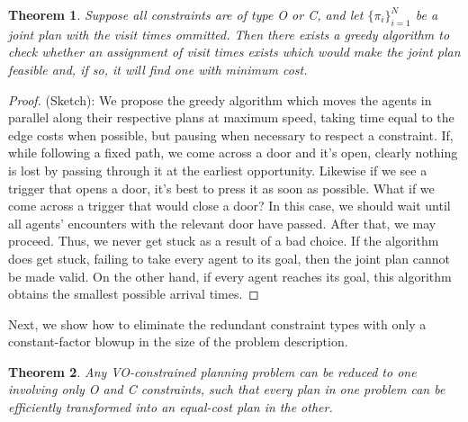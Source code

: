 \documentclass[letterpaper]{article}
\newtheorem{thm}{Theorem}
\begin{document}
\begin{thm}
\label{thm:greedy}
Suppose all constraints are of type O or C, and let $\{\pi_i\}_{i=1}^N$ be a joint plan with the visit times ommitted. Then there exists a greedy algorithm to check whether an assignment of visit times exists which would make the joint plan feasible and, if so, it will find one with minimum cost.
\end{thm} 

\begin{proof}
(Sketch): We propose the greedy algorithm which moves the agents in parallel along their respective plans at maximum speed, taking time equal to the edge costs when possible, but pausing when necessary to respect a constraint. If, while following a fixed path, we come across a door and it's open, clearly nothing is lost by passing through it at the earliest opportunity. Likewise if we see a trigger that opens a door, it's best to press it as soon as possible. What if we come across a trigger that would close a door? In this case, we should wait until all agents' encounters with the relevant door have passed. After that, we may proceed. Thus, we never get stuck as a result of a bad choice. If the algorithm does get stuck, failing to take every agent to its goal, then the joint plan cannot be made valid. On the other hand, if every agent reaches its goal, this algorithm obtains the smallest possible arrival times.
\end{proof}

Next, we show how to eliminate the redundant constraint types with only a constant-factor blowup in the size of the problem description.

\begin{thm}
\label{thm:OC}
Any VO-constrained planning problem can be reduced to one involving only O and C constraints, such that every plan in one problem can be efficiently transformed into an equal-cost plan in the other.
\end{thm}
\end{document}
